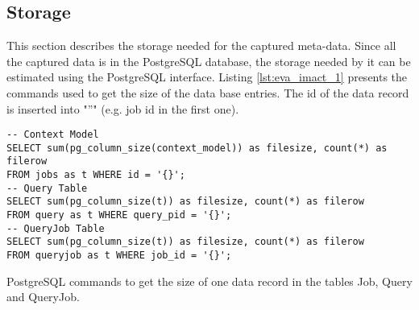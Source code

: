 \documentclass[draft,final]{vutinfth} %
\begin{document}

\subsection*{Storage}\label{Evaluation:impact_stor}
This section describes the storage needed for the captured meta-data. Since all the captured data is in the PostgreSQL database, the storage needed by it can be estimated using the PostgreSQL interface. Listing \ref{lst:eva_imact_1} presents the commands used to get the size of the data base entries. The id of the data record is inserted into "''" (e.g. job id in the first one).  

\begin{listing}[ht]
	\begin{verbatim}
-- Context Model 
SELECT sum(pg_column_size(context_model)) as filesize, count(*) as filerow 
FROM jobs as t WHERE id = '{}';
-- Query Table
SELECT sum(pg_column_size(t)) as filesize, count(*) as filerow 
FROM query as t WHERE query_pid = '{}';
-- QueryJob Table
SELECT sum(pg_column_size(t)) as filesize, count(*) as filerow 
FROM queryjob as t WHERE job_id = '{}';
	\end{verbatim}
	\caption{PostgreSQL commands to get the size of one data record in the tables Job, Query and QueryJob.}
	\label{lst:eva_imact_1}
\end{listing}	

\end{document}
